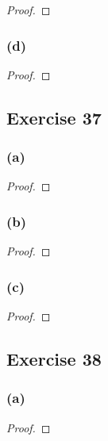 \documentclass[14pt]{extarticle}
\begin{document}
\begin{proof}

\end{proof}

\subsubsection{(d)}

\begin{proof}

\end{proof}

\subsection{Exercise 37}

\subsubsection{(a)}

\begin{proof}

\end{proof}

\subsubsection{(b)}

\begin{proof}

\end{proof}

\subsubsection{(c)}

\begin{proof}

\end{proof}

\subsection{Exercise 38}

\subsubsection{(a)}

\begin{proof}

\end{proof}
\end{document}
